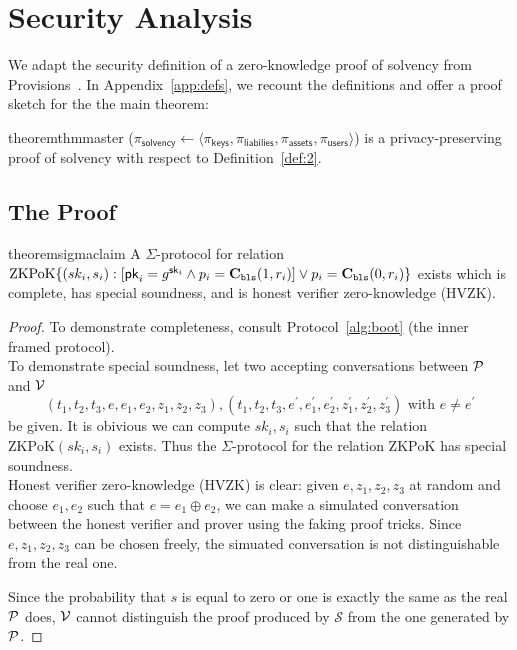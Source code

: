 \chapter{Security Analysis}
\label{sec:proof}

We adapt the security definition of a zero-knowledge proof of solvency from Provisions~\cite{provisions}. In Appendix~\ref{app:defs}, we recount the definitions and offer a proof sketch for the the main theorem:

\begin{restatable}{theorem}{thmmaster}
\label{thm:master}
\Sys ($\pi_\mathsf{solvency}\leftarrow\langle \pi_\mathsf{keys}, \pi_\mathsf{liabilies}, \pi_\mathsf{assets}, \pi_\mathsf{users} \rangle$) is a privacy-preserving proof of solvency with respect to Definition~\ref{def:2}. 
\end{restatable}


\section{The \bootstrap Proof}
\label{sec:claims}


\begin{restatable}{theorem}{sigmaclaim}
\label{thm:sigmaclaim}
A $\Sigma$-protocol for relation $\mathrm{ZKPoK} \{ (sk_i,s_i) :  [\mathsf{pk}_i=g^{\mathsf{sk}_i} \land p_i=\textbf{C}_\texttt{bls}(1,r_i)  ] \lor p_i=\textbf{C}_\texttt{bls}(0,r_i) \}$ exists which is complete, has special soundness, and is honest verifier zero-knowledge (HVZK).
\end{restatable}

\begin{proof}

To demonstrate completeness, consult Protocol~\ref{alg:boot} (the inner framed protocol). \\
To demonstrate special soundness, let two accepting conversations between $\mathcal{P}$ and $\mathcal{V}$
$$
(t_1,t_2,t_3,e,e_1,e_2,z_1,z_2,z_3),(t_1,t_2,t_3,e^\prime,e_1^\prime,e_2^\prime,z_1^\prime,z_2^\prime,z_3^\prime)\text{ with $e\ne{e^\prime}$}
$$
be given. It is obivious we can compute $sk_i,s_i$ such that the relation $\mathrm{ZKPoK}(sk_i,s_i)$ exists. Thus the $\Sigma$-protocol for the relation $\mathrm{ZKPoK}$ has special soundness. \\
Honest verifier zero-knowledge (HVZK) is clear: given $e,z_1,z_2,z_3$ at random and choose $e_1,e_2$ such that $e=e_1\oplus{e_2}$, we can make a simulated conversation between the honest verifier and prover using the faking proof tricks. Since $e,z_1,z_2,z_3$ can be chosen freely, the simuated conversation is not distinguishable from the real one.

Since the probability that $s$ is equal to zero or one is exactly the same as the real $\mathcal{P}$ does, $\mathcal{V}$ cannot distinguish the proof produced by $\mathcal{S}$ from the one generated by $\mathcal{P}$. \end{proof}


